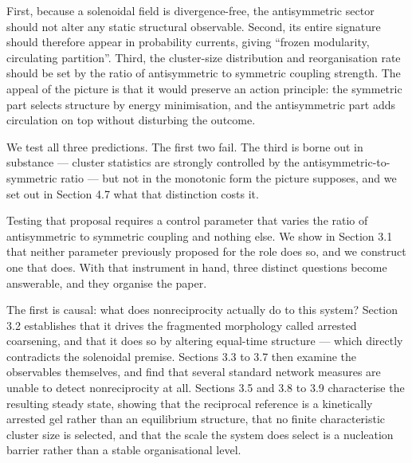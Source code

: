 \documentclass[aps,pre,preprint,superscriptaddress,nofootinbib,longbibliography]{revtex4-2}
\begin{document}
First, because a solenoidal field is divergence-free, the antisymmetric sector should not alter any static structural observable. Second, its entire signature should therefore appear in probability currents, giving ``frozen modularity, circulating partition''. Third, the cluster-size distribution and reorganisation rate should be set by the ratio of antisymmetric to symmetric coupling strength. The appeal of the picture is that it would preserve an action principle: the symmetric part selects structure by energy minimisation, and the antisymmetric part adds circulation on top without disturbing the outcome.

We test all three predictions. The first two fail. The third is borne out in substance --- cluster statistics are strongly controlled by the antisymmetric-to-symmetric ratio --- but not in the monotonic form the picture supposes, and we set out in Section 4.7 what that distinction costs it.

Testing that proposal requires a control parameter that varies the ratio of antisymmetric to symmetric coupling and nothing else. We show in Section 3.1 that neither parameter previously proposed for the role does so, and we construct one that does. With that instrument in hand, three distinct questions become answerable, and they organise the paper.

The first is causal: what does nonreciprocity actually do to this system? Section 3.2 establishes that it drives the fragmented morphology called arrested coarsening, and that it does so by altering equal-time structure --- which directly contradicts the solenoidal premise. Sections 3.3 to 3.7 then examine the observables themselves, and find that several standard network measures are unable to detect nonreciprocity at all. Sections 3.5 and 3.8 to 3.9 characterise the resulting steady state, showing that the reciprocal reference is a kinetically arrested gel rather than an equilibrium structure, that no finite characteristic cluster size is selected, and that the scale the system does select is a nucleation barrier rather than a stable organisational level.
\end{document}
